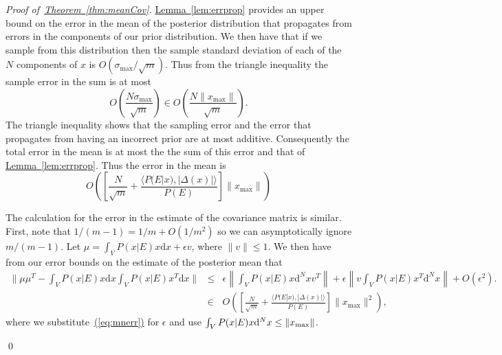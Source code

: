 \documentclass[twoside]{article}
\newenvironment{proofof}[1]{\begin{trivlist}\item[]{\flushleft\it
Proof of~#1.}}
{\qed\end{trivlist}}
\newcommand{\eq}[1]{\hyperref[eq:#1]{(\ref*{eq:#1})}}
\newcommand{\thm}[1]{\hyperref[thm:#1]{Theorem~\ref*{thm:#1}}}
\newcommand{\lem}[1]{\hyperref[lem:#1]{Lemma~\ref*{lem:#1}}}
\begin{document}
\begin{proofof}{\thm{meanCov}}
\lem{errprop} provides an upper bound on the error in the mean of the posterior distribution that propagates from errors in the components of our prior distribution.  We then have that if we sample from this distribution then the sample standard deviation of each of the $N$ components of $x$ is $O(\sigma_{\max}/\sqrt{m})$.  Thus from the triangle inequality the sample error in the sum is at most 
\begin{equation}
O\left(\frac{{N}\sigma_{\max}}{\sqrt{m}}\right)\in O\left( \frac{N\|x_{\max}\|}{\sqrt{m}}\right).
\end{equation}  
The triangle inequality shows that the sampling error and the error that propagates from having an incorrect prior are at most additive.  Consequently the total error in the mean is at most the the sum of this error and that of \lem{errprop}.  Thus the error in the mean is
\begin{equation}
O\left(\left[\frac{N}{\sqrt{m}}+ \frac{\langle P(E|x),|\Delta(x)|\rangle}{P(E)}\right]\|x_{\max}\| \right)\label{eq:mnerr}
\end{equation}

 The calculation for the error in the estimate of the covariance matrix is similar.  First, note that $1/(m-1)= 1/m +O(1/m^2)$ so we can asymptotically ignore $m/(m-1)$.  Let $\mu = \int_V P(x|E) x\mathrm{d}x +\epsilon v$, where $\|v\|\le 1$.  We then have from our error bounds on the estimate of the posterior mean that
\begin{eqnarray}
\| \mu\mu^T - \int_V P(x|E) x\mathrm{d}x \int_V P(x|E) x^T\mathrm{d}x \|&\le& \epsilon \left\|\int_V P(x|E) x\mathrm{d}^Nx v^T\right\|+\epsilon\left\|v\int_V  P(x|E) x^T\mathrm{d}^Nx\right\| + O(\epsilon^2).\nonumber\\
&\in&  O\left(\left[\frac{{N}}{\sqrt{m}} +\frac{\langle P(E|x), |\Delta(x)|\rangle}{P(E)}\right]\|x_{\max}\|^2\right),\label{eq:garbage}
\end{eqnarray}
where we substitute~\eq{mnerr} for $\epsilon$ and use $\int_V P(x|E) x\mathrm{d}^Nx\le \|x_{\rm max}\|$.


\end{proofof}
\end{document}
